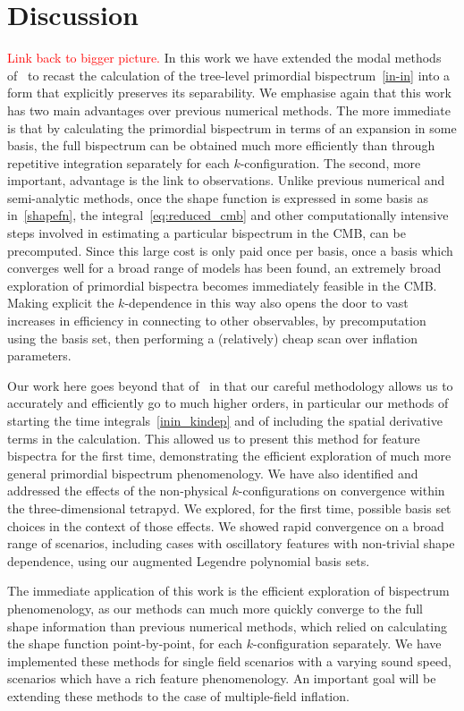 \section{Discussion}
\textcolor{red}{
    Link back to bigger picture.
}
In this work we have extended the modal methods of~\cite{FergShell_1,FergShell_2,FergShell_3}
to recast the calculation of the tree-level primordial bispectrum~\eqref{in-in}
into a form that explicitly preserves its separability.
We emphasise again that this work has two main advantages over previous
numerical methods. The more immediate is that by calculating the primordial
bispectrum in terms of an expansion in some basis, the full bispectrum can
be obtained much more efficiently than through repetitive integration
separately for each $k$-configuration. The second, more important, advantage
is the link to observations.
Unlike previous numerical and semi-analytic methods,
once the shape function is expressed in some basis
as in~\eqref{shapefn},
the integral~\eqref{eq:reduced_cmb} and other computationally intensive steps involved
in estimating a particular bispectrum in the CMB, can be precomputed. Since this
large cost is only paid once per basis, once a basis
which converges well for a broad range of models
has been found, an extremely broad exploration of primordial bispectra becomes immediately feasible in the CMB.
Making explicit the $k$-dependence in this way also opens the door to vast increases in efficiency in
connecting to other observables, by precomputation using the basis set, then performing a (relatively) cheap
scan over inflation parameters.


Our work here goes beyond that of~\cite{Funakoshi} in that our careful methodology
allows us to accurately and efficiently go to much higher orders,
in particular our methods of starting the time integrals~\eqref{inin_kindep}
and of including the spatial derivative terms in the calculation.
This allowed us to present this method for feature bispectra for the first time,
demonstrating the efficient exploration of much more general primordial bispectrum phenomenology.
We have also identified and addressed the effects
of the non-physical $k$-configurations on convergence within the three-dimensional tetrapyd.
We explored, for the first time, possible basis set choices in the context
of those effects.
We showed rapid convergence on a broad range of scenarios,
including cases with oscillatory features with non-trivial shape dependence,
using our augmented Legendre polynomial basis sets.

The immediate application of this work is the efficient exploration of
bispectrum phenomenology, as our methods can much more quickly
converge to the full shape information than previous numerical methods,
which relied on calculating the shape function point-by-point, for each $k$-configuration separately.
We have implemented these methods for single field scenarios
with a varying sound speed, scenarios which
have a rich feature phenomenology. An important goal will be extending
these methods to the case of multiple-field inflation.


